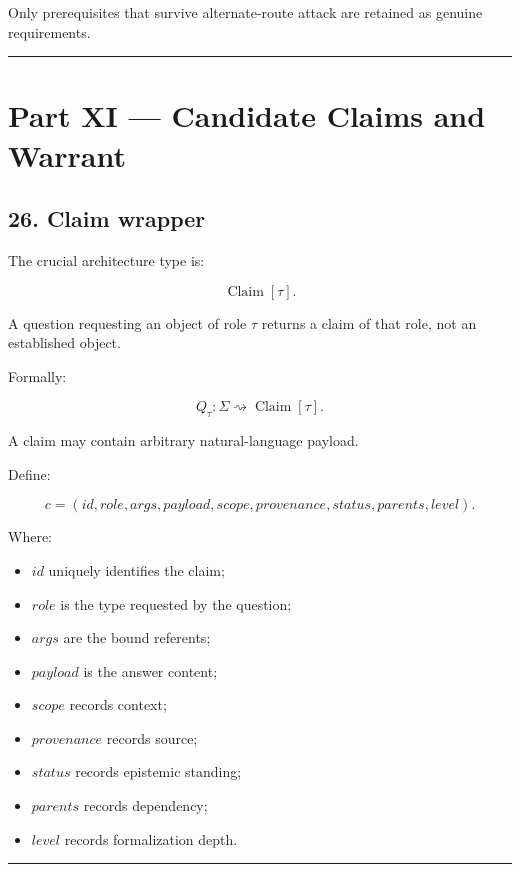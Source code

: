 \documentclass[
]{article}
\providecommand{\tightlist}{%
  \setlength{\itemsep}{0pt}\setlength{\parskip}{0pt}}
\begin{document}
Only prerequisites that survive alternate-route attack are retained as
genuine requirements.

\begin{center}\rule{0.5\linewidth}{0.5pt}\end{center}

\section{Part XI --- Candidate Claims and
Warrant}\label{part-xi-candidate-claims-and-warrant}

\subsection{26. Claim wrapper}\label{claim-wrapper}

The crucial architecture type is:

\[
\boxed{
\operatorname{Claim}[\tau].
}
\]

A question requesting an object of role \(\tau\) returns a claim of that
role, not an established object.

Formally:

\[
\boxed{
Q_\tau
:
\Sigma
\rightsquigarrow
\operatorname{Claim}[\tau].
}
\]

A claim may contain arbitrary natural-language payload.

Define:

\[
\boxed{
c=
(
id,
role,
args,
payload,
scope,
provenance,
status,
parents,
level
).
}
\]

Where:

\begin{itemize}
\tightlist
\item
  \(id\) uniquely identifies the claim;
\item
  \(role\) is the type requested by the question;
\item
  \(args\) are the bound referents;
\item
  \(payload\) is the answer content;
\item
  \(scope\) records context;
\item
  \(provenance\) records source;
\item
  \(status\) records epistemic standing;
\item
  \(parents\) records dependency;
\item
  \(level\) records formalization depth.
\end{itemize}

\begin{center}\rule{0.5\linewidth}{0.5pt}\end{center}
\end{document}
